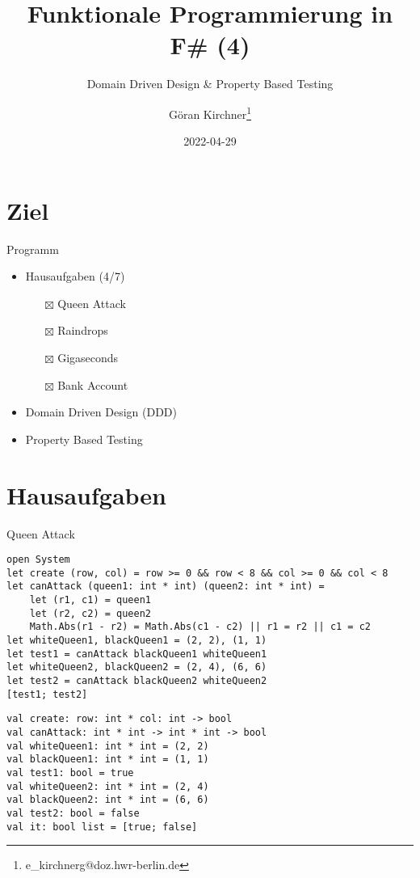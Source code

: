 \documentclass[t]{beamer}
\author{Göran Kirchner\thanks{e\_kirchnerg@doz.hwr-berlin.de}}
\date{2022-04-29}
\title{Funktionale Programmierung in F\# (4)}
\subtitle{Domain Driven Design \& Property Based Testing}
\begin{document}
\maketitle

\section{Ziel }
\label{sec:org531b5e9}
\begin{frame}[label={sec:orgffa894b}]{Programm}
\begin{itemize}
\item Hausaufgaben (4/7)
\begin{itemize}
\item[{$\boxtimes$}] Queen Attack
\item[{$\boxtimes$}] Raindrops
\item[{$\boxtimes$}] Gigaseconds
\item[{$\boxtimes$}] Bank Account
\end{itemize}
\item Domain Driven Design (DDD)
\item Property Based Testing
\end{itemize}
\end{frame}

\section{Hausaufgaben }
\label{sec:org27ad133}
\begin{frame}[label={sec:org5e5d2ba},fragile]{Queen Attack}
 \begin{verbatim}
open System
let create (row, col) = row >= 0 && row < 8 && col >= 0 && col < 8
let canAttack (queen1: int * int) (queen2: int * int) = 
    let (r1, c1) = queen1
    let (r2, c2) = queen2
    Math.Abs(r1 - r2) = Math.Abs(c1 - c2) || r1 = r2 || c1 = c2
let whiteQueen1, blackQueen1 = (2, 2), (1, 1)
let test1 = canAttack blackQueen1 whiteQueen1
let whiteQueen2, blackQueen2 = (2, 4), (6, 6)
let test2 = canAttack blackQueen2 whiteQueen2
[test1; test2]
\end{verbatim}

\begin{verbatim}
val create: row: int * col: int -> bool
val canAttack: int * int -> int * int -> bool
val whiteQueen1: int * int = (2, 2)
val blackQueen1: int * int = (1, 1)
val test1: bool = true
val whiteQueen2: int * int = (2, 4)
val blackQueen2: int * int = (6, 6)
val test2: bool = false
val it: bool list = [true; false]
\end{verbatim}
\end{frame}
\end{document}
